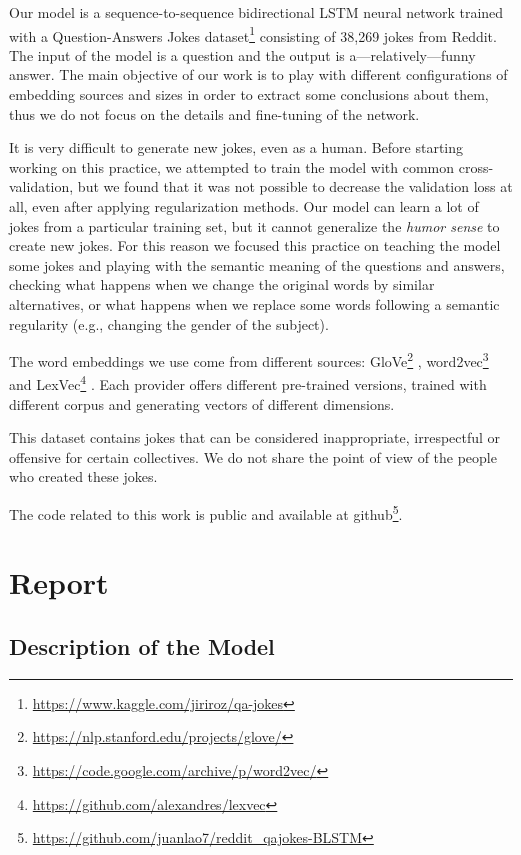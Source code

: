 \documentclass[]{article}
\begin{document}
	Our model is a sequence-to-sequence bidirectional LSTM neural network trained with a Question-Answers Jokes dataset\footnote{\url{https://www.kaggle.com/jiriroz/qa-jokes}} consisting of 38,269 jokes from Reddit. The input of the model is a question and the output is a---relatively---funny answer. The main objective of our work is to play with different configurations of embedding sources and sizes in order to extract some conclusions about them, thus we do not focus on the details and fine-tuning of the network.
	
	It is very difficult to generate new jokes, even as a human. Before starting working on this practice, we attempted to train the model with common cross-validation, but we found that it was not possible to decrease the validation loss at all, even after applying regularization methods. Our model can learn a lot of jokes from a particular training set, but it cannot generalize the \emph{humor sense} to create new jokes. For this reason we focused this practice on teaching the model some jokes and playing with the semantic meaning of the questions and answers, checking what happens when we change the original words by similar alternatives, or what happens when we replace some words following a semantic regularity (e.g., changing the gender of the subject).
	
	The word embeddings we use come from different sources: GloVe\footnote{\url{https://nlp.stanford.edu/projects/glove/}} \cite{pennington2014glove}, word2vec\footnote{\url{https://code.google.com/archive/p/word2vec/}} \cite{mikolov2013efficient} \cite{mikolov2013distributed} and LexVec\footnote{\url{https://github.com/alexandres/lexvec}} \cite{salle2016matrix}. Each provider offers different pre-trained versions, trained with different corpus and generating vectors of different dimensions.
	
	This dataset contains jokes that can be considered inappropriate, irrespectful or offensive for certain collectives. We do not share the point of view of the people who created these jokes.
	
	The code related to this work is public and available at github\footnote{\url{https://github.com/juanlao7/reddit_qajokes-BLSTM}}.
	
	\section{Report}
	
	\subsection{Description of the Model}
	
\end{document}
